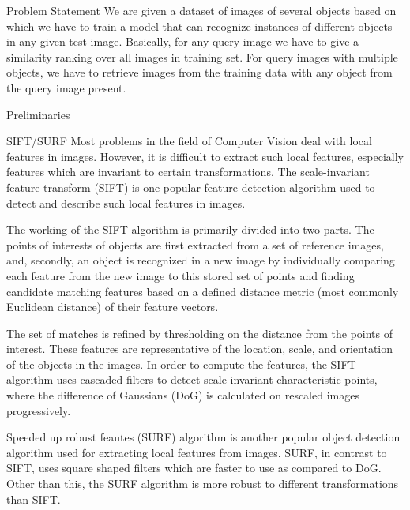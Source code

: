 \documentclass{article}
\begin{document}
\makeheader

\begin{ssection}{Problem Statement}
We are given a dataset of images of several objects based on which we have to train a model that can recognize instances of different objects in any given test image. Basically, for any query image we have to give a similarity ranking over all images in training set. For query images with multiple objects, we have to retrieve images from the training data with any object from the query image present.
\end{ssection}

\begin{ssection}{Preliminaries}

    \begin{ssubsection}{SIFT/SURF}
        Most problems in the field of Computer Vision deal with local features in images. However, it is difficult to extract such local features, especially features which are invariant to certain transformations. The scale-invariant feature transform (SIFT) is one popular feature detection algorithm used to detect and describe such local features in images. 
        
        The working of the SIFT algorithm is primarily divided into two parts. The points of interests of objects are first extracted from a set of reference images, and, secondly, an object is recognized in a new image by individually comparing each feature from the new image to this stored set of points and finding candidate matching features based on a defined distance metric (most commonly Euclidean distance) of their feature vectors.
        
        The set of matches is refined by thresholding on the distance from the points of interest. These features are representative of the location, scale, and orientation of the objects in the images. In order to compute the features, the SIFT algorithm uses cascaded filters to detect scale-invariant characteristic points, where the difference of Gaussians (DoG) is calculated on rescaled images progressively.
        
        Speeded up robust feautes (SURF) algorithm is another popular object detection algorithm used for extracting local features from images. SURF, in contrast to SIFT, uses square shaped filters which are faster to use as compared to DoG. Other than this, the SURF algorithm is more robust to different transformations than SIFT.
    \end{ssubsection}
    

\end{ssection}
\end{document}
